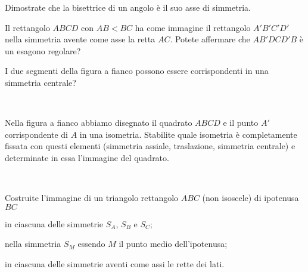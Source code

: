 \begin{esercizio}
\label{ese:8.92} %
Dimostrate che la bisettrice di un angolo è il suo asse di simmetria.
\end{esercizio}

\begin{esercizio}
\label{ese:8.93} %
Il rettangolo \(ABCD\) con \(AB<BC\) ha come immagine il rettangolo 
\(A'B'C'D'\) nella simmetria avente come asse la retta \(AC\). Potete 
affermare che \(AB'DCD'B\) è un esagono regolare?
\end{esercizio}

\noindent\begin{minipage}{0.75\textwidth}\parindent15pt
\begin{esercizio}
\label{ese:8.94} %
I due segmenti della figura a fianco possono essere corrispondenti in 
una simmetria centrale? 
\end{esercizio}
\end{minipage}\hfil
\begin{minipage}{0.25\textwidth}
	\centering~~
\end{minipage}\vspace{8pt}

\noindent\begin{minipage}{0.65\textwidth}\parindent15pt
\begin{esercizio}
\label{ese:8.95} %
Nella figura a fianco abbiamo disegnato il quadrato \(ABCD\) e il punto 
\(A'\) corrispondente di \(A\) in una isometria. Stabilite quale 
isometria è completamente fissata con questi elementi (simmetria 
assiale, traslazione, simmetria centrale) e determinate in essa 
l'immagine del quadrato. 
\end{esercizio}
\end{minipage}\hfil
\begin{minipage}{0.35\textwidth}
	\centering~~
\end{minipage}\vspace{8pt}

\begin{esercizio}
\label{ese:8.96} %
Costruite l'immagine di un triangolo rettangolo \(ABC\) (non isoscele) 
di ipotenusa \(BC\)
\begin{enumeratea}
\item in ciascuna delle simmetrie \(S_A\), \(S_B\) e \(S_C\);
\item nella simmetria \(S_M\) essendo \(M\) il punto medio dell'ipotenusa;
\item in ciascuna delle simmetrie aventi come assi le rette dei lati.
\end{enumeratea}
\end{esercizio}


